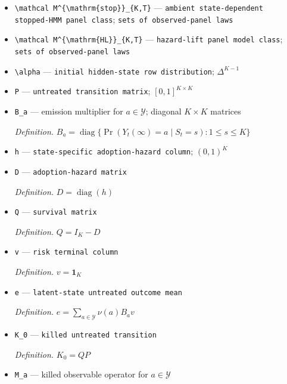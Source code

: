 \documentclass{article}
\begin{document}
\begin{itemize}
  \item \texttt{\textbackslash{}\allowbreak{}mathcal M\textasciicircum{}\{\textbackslash{}\allowbreak{}mathrm\{stop\}\allowbreak{}\}\allowbreak{}\_\allowbreak{}\{K,\allowbreak{}T\}\allowbreak{}} --- \texttt{ambient state-\allowbreak{}dependent stopped-\allowbreak{}HMM panel class}; \texttt{sets of observed-\allowbreak{}panel laws}
  \item \texttt{\textbackslash{}\allowbreak{}mathcal M\textasciicircum{}\{\textbackslash{}\allowbreak{}mathrm\{HL\}\allowbreak{}\}\allowbreak{}\_\allowbreak{}\{K,\allowbreak{}T\}\allowbreak{}} --- \texttt{hazard-\allowbreak{}lift panel model class}; \texttt{sets of observed-\allowbreak{}panel laws}
  \item \texttt{\textbackslash{}\allowbreak{}alpha} --- \texttt{initial hidden-\allowbreak{}state row distribution}; \(\Delta^{K-1}\)
  \item \texttt{P} --- \texttt{untreated transition matrix}; \([0,1]^{K\times K}\)
  \item \texttt{B\_\allowbreak{}a} --- emission multiplier for \(a\in\mathcal Y\); diagonal \(K\times K\) matrices
  \par\smallskip\noindent\emph{Definition.} \(B_a=\operatorname{diag}\{\Pr(Y_t(\infty)=a\mid S_t=s):1\le s\le K\}\)
  \item \texttt{h} --- \texttt{state-\allowbreak{}specific adoption-\allowbreak{}hazard column}; \((0,1)^K\)
  \item \texttt{D} --- \texttt{adoption-\allowbreak{}hazard matrix}
  \par\smallskip\noindent\emph{Definition.} \(D=\operatorname{diag}(h)\)
  \item \texttt{Q} --- \texttt{survival matrix}
  \par\smallskip\noindent\emph{Definition.} \(Q=I_K-D\)
  \item \texttt{v} --- \texttt{risk terminal column}
  \par\smallskip\noindent\emph{Definition.} \(v=\mathbf 1_K\)
  \item \texttt{e} --- \texttt{latent-\allowbreak{}state untreated outcome mean}
  \par\smallskip\noindent\emph{Definition.} \(e=\sum_{a\in\mathcal Y}\nu(a)B_av\)
  \item \texttt{K\_\allowbreak{}0} --- \texttt{killed untreated transition}
  \par\smallskip\noindent\emph{Definition.} \(K_0=QP\)
  \item \texttt{M\_\allowbreak{}a} --- killed observable operator for \(a\in\mathcal Y\)

\end{itemize}
\end{document}

